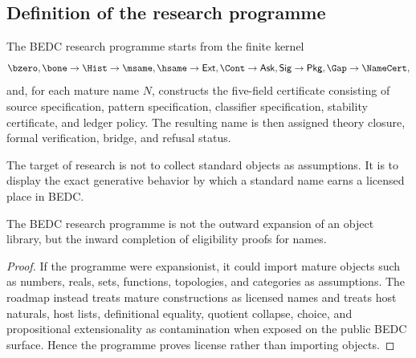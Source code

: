 \subsection{Definition of the research programme}
\label{subsec:philosophy-programme-definition}

\begin{definition}
\label{def:philosophy-bedc-research-programme}
The BEDC research programme starts from the finite kernel
$$
\bzero,\bone \to \Hist \to \msame,\hsame \to
\mathsf{Ext},\Cont \to \mathsf{Ask},\mathsf{Sig}
\to \mathsf{Pkg},\Gap \to \NameCert,
$$
and, for each mature name \(N\), constructs the five-field certificate
consisting of source specification, pattern specification, classifier
specification, stability certificate, and ledger policy. The resulting
name is then assigned theory closure, formal verification, bridge, and
refusal status.
\end{definition}

\begin{definition}
\label{def:philosophy-programme-research-target}
The target of research is not to collect standard objects as
assumptions. It is to display the exact generative behavior by which a
standard name earns a licensed place in BEDC.
\end{definition}

\begin{theorem}
\label{thm:philosophy-programme-not-expansionism}
The BEDC research programme is not the outward expansion of an object
library, but the inward completion of eligibility proofs for names.
\end{theorem}
\begin{proof}
If the programme were expansionist, it could import mature objects such
as numbers, reals, sets, functions, topologies, and categories as
assumptions. The roadmap instead treats mature constructions as
licensed names and treats host naturals, host lists, definitional
equality, quotient collapse, choice, and propositional extensionality
as contamination when exposed on the public BEDC surface. Hence the
programme proves license rather than importing objects.
\end{proof}


